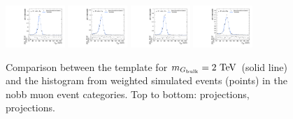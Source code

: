 \begin{figure}[htpb]
  \includegraphics[width=0.2\textwidth]{fig/2Dfit/templateVsReco_VBFGbuToWW2000_r0_MJ_mu_HP_nobb_LDy.pdf}
  \includegraphics[width=0.2\textwidth]{fig/2Dfit/templateVsReco_VBFGbuToWW2000_r0_MJ_mu_LP_nobb_LDy.pdf}
  \includegraphics[width=0.2\textwidth]{fig/2Dfit/templateVsReco_VBFGbuToWW2000_r0_MJ_mu_HP_nobb_HDy.pdf}
  \includegraphics[width=0.2\textwidth]{fig/2Dfit/templateVsReco_VBFGbuToWW2000_r0_MJ_mu_LP_nobb_HDy.pdf}\\
  \caption{
    Comparison between the \VBF\GBulktoWW template for $m_{\GBulk}=2\unit{TeV}$ (solid line) and the histogram from weighted simulated events (points) in the nobb muon event categories.
    Top to bottom: \MVV projections, \MJ projections.
  }
  \label{fig:1dtemplateVsReco_VBFGbuToWW2000_Run2}
\end{figure}

